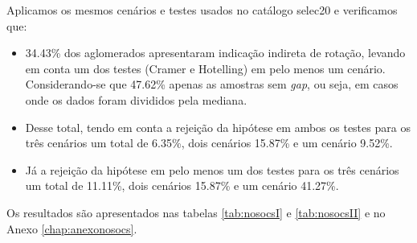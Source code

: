 Aplicamos os mesmos cenários e testes usados no catálogo selec20 e verificamos que:

\begin{itemize}
   	\item 34.43\% dos aglomerados apresentaram indicação indireta de rotação, levando em conta um dos testes (Cramer e Hotelling) em pelo menos um cenário. Considerando-se que 47.62\% apenas as amostras sem \textit{gap}, ou seja, em casos onde os dados foram divididos pela mediana. 
   	\item Desse total, tendo em conta a rejeição da hipótese em ambos os testes para os três cenários um total de 6.35\%, dois cenários 15.87\% e um cenário 9.52\%.
   	\item Já a rejeição da hipótese em pelo menos um dos testes para os três cenários um total de 11.11\%, dois cenários 15.87\% e um cenário 41.27\%. 
 \end{itemize} 

 Os resultados são apresentados nas tabelas \ref{tab:nosocsI} e \ref{tab:nosocsII} e no Anexo \ref{chap:anexonosocs}. 

